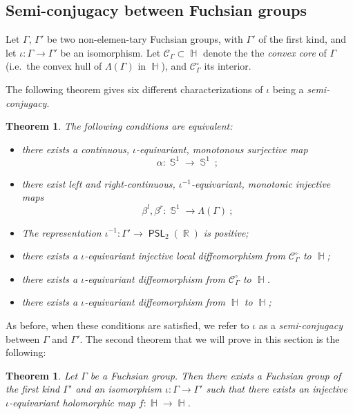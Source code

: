 \documentclass{amsart}
\theoremstyle{plain}
\newtheorem{theorem}[proposition]{Theorem}
\theoremstyle{definition}
\DeclareMathOperator{\PSL}{\mathsf{PSL}}
\DeclareMathOperator{\Hb}{\mathbb{H}}
\DeclareMathOperator{\Rb}{{\mathbb{R}}}
\DeclareMathOperator{\Sb}{\mathbb{S}}
\newcommand{\1}{\mathbf{1}}
\begin{document}
\subsection{Semi-conjugacy between Fuchsian groups}
Let $\Gamma$, $\Gamma'$ be two non-elemen-tary Fuchsian groups, with $\Gamma'$ of the first kind, and let $\iota\colon \Gamma \to \Gamma'$ be an isomorphism. Let $\mathcal C_\Gamma \subset \Hb$ denote the the \emph{convex core} of $\Gamma$ (i.e.\ the convex hull of $\Lambda(\Gamma)$ in $\Hb$), and $\mathcal{C}^\circ_\Gamma$ its interior.

The following theorem gives six different characterizations of $\iota$ being a \emph{semi-conjugacy}.

\begin{theorem} \label{thm: Equivalences semi-conjugation}
    The following conditions are equivalent:
    \begin{itemize}
        \item[(i)] there exists a continuous, $\iota$-equivariant, monotonous surjective map
        \[\alpha\colon \Sb^1 \to \Sb^1~;\]
        \item[(ii)] there exist left and right-continuous, $\iota^{-1}$-equivariant, monotonic injective maps
        \[\beta^l, \beta^r\colon \Sb^1 \to \Lambda(\Gamma)~;\]
        \item[(iii)] The representation $\iota^{-1}: \Gamma' \to \PSL_2(\Rb)$ is positive;
        \item[(iv)] there exists a $\iota$-equivariant injective local diffeomorphism from $\mathcal C^\circ_\Gamma$ to $\Hb$;
        \item[(v)] there exists a $\iota$-equivariant diffeomorphism from $\mathcal C^\circ_\Gamma$ to $\Hb$.
        \item[(vi)] there exists a $\iota$-equivariant diffeomorphism from $\Hb$ to $\Hb$;
    \end{itemize}
\end{theorem}
As before, when these conditions are satisfied, we refer to $\iota$ as a \emph{semi-conjugacy} between $\Gamma$ and $\Gamma'$. 
The second theorem that we will prove in this section is the following:
\begin{theorem} \label{thm: Existence semiconjugation}
    Let $\Gamma$ be a Fuchsian group. Then there exists a Fuchsian group of the first kind $\Gamma'$ and an isomorphism $\iota:\Gamma \to \Gamma'$ such that there exists an injective $\iota$-equivariant \emph{holomorphic} map $f:\Hb\to \Hb$.
\end{theorem}
\end{document}
